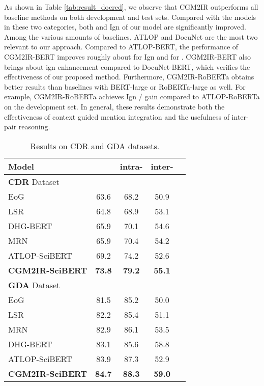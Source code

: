 \documentclass[11pt]{article}
\begin{document}
As shown in Table \ref{tab:result_docred}, we observe that CGM2IR outperforms all baseline methods on both development and test sets.
Compared with the models in these two categories, both  and Ign  of our model are significantly improved.
Among the various amounts of baselines, ATLOP \citep{DBLP:conf/aaai/Zhou0M021} and DocuNet \cite{DBLP:conf/ijcai/ZhangCXDTCHSC21} are the most two relevant to our approach.
Compared to ATLOP-BERT, the performance of CGM2IR-BERT improves roughly about  for Ign  and  for .
CGM2IR-BERT also brings about  ign  enhancement compared to DocuNet-BERT, which verifies the effectiveness of our proposed method.
Furthermore, CGM2IR-RoBERTa obtains better results than baselines with BERT-large or RoBERTa-large as well.
For example, CGM2IR-RoBERTa achieves  Ign /  gain compared to ATLOP-RoBERTa on the development set. 
In general, these results demonstrate both the effectiveness of context guided mention integration and the usefulness of inter-pair reasoning.
\begin{table}[t]
	\centering
	\small
	\begin{tabular}{lcccc}
		\toprule
		Model &    &  intra- &  inter-\\
		\midrule
		\textbf{ CDR} Dataset & & &\\ \hdashline
		EoG  &  63.6 & 68.2 & 50.9  \\ 
		LSR  & 64.8  &68.9  &53.1 \\ 
		DHG-BERT  &   65.9  & 70.1   &  54.6 \\ 
		MRN  & 65.9 & 70.4   & 54.2 \\  
		ATLOP-SciBERT   &  69.2 & 74.2 & 52.6 \\ \hdashline
		\textbf{CGM2IR-SciBERT}   & \textbf{73.8} &\textbf{ 79.2} &\textbf{55.1}  \\  \hline \hline
		\textbf{ GDA} Dataset & & &\\ \hdashline
		EoG  &  81.5 & 85.2 &  50.0  \\ 
		LSR  &  82.2 & 85.4  & 51.1 \\ 
		MRN  & 82.9  & 86.1  & 53.5 \\  
		DHG-BERT  &  83.1 & 85.6 & 58.8  \\ 
		ATLOP-SciBERT   &  83.9 & 87.3  & 52.9  \\ \hdashline
		\textbf{CGM2IR-SciBERT}    & \textbf{84.7}  & \textbf{88.3}  & \textbf{59.0}  \\
		\bottomrule
	\end{tabular}
	\caption{Results on CDR and GDA datasets.}
	\label{tab:result_cdrgda}
\end{table}
\end{document}
